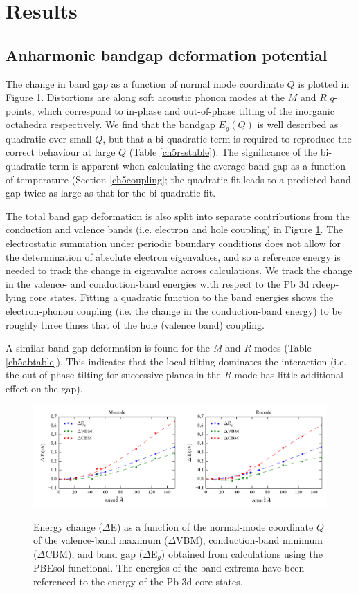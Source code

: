 \section{Results}
\subsection{Anharmonic bandgap deformation potential}
The change in band gap as a function of normal mode coordinate $Q$ is plotted in Figure \ref{ch5figs1}. Distortions are along soft acoustic phonon modes at the $M$ and $R$ $q$-points, which correspond to in-phase and out-of-phase tilting of the inorganic octahedra respectively.
We find that the bandgap $E_g(Q)$ is well described as quadratic over small $Q$, but that a bi-quadratic term is required to reproduce the correct behaviour at large $Q$ (Table \ref{ch5rsstable}). 
The significance of the bi-quadratic term is apparent when calculating the average band gap as a function of temperature (Section \ref{ch5coupling}; the quadratic fit leads to a predicted band gap twice as large as that for the bi-quadratic fit.

The total band gap deformation is also split into separate contributions from the conduction and valence bands (i.e. electron and hole coupling) in Figure \ref{ch5figs1}.
The electrostatic summation under periodic boundary conditions 
does not allow for the determination of absolute electron eigenvalues, and so a reference energy is needed to track the change in eigenvalue across calculations.  
We track the change in the valence- 
and conduction-band energies with respect to the Pb 3d rdeep-lying core states.
Fitting a quadratic function to the band energies shows the electron-phonon coupling (i.e. the change in the conduction-band energy)
to be roughly three times that of the hole (valence band) coupling. 

A similar band gap deformation is found for the \textit{M} and \textit{R} modes (Table \ref{ch5abtable}). This indicates that the local tilting dominates the interaction (i.e. the out-of-phase tilting for successive planes in the \textit{R} mode has little additional effect on the gap).

\begin{figure}[h]
\includegraphics[width=\textwidth]{figures/ch5/fig_s3.png} \label{ch5figs1}
\caption[Bandgap deformation potential]{
Energy change ($\Delta$E) as a function of the normal-mode coordinate $Q$ of the valence-band maximum ($\Delta$VBM), conduction-band minimum ($\Delta$CBM), and band gap ($\Delta$E$_g$) obtained from calculations using the PBEsol functional.
The energies of the band extrema have been referenced to the energy of the Pb 3d core states.
}
\end{figure}


